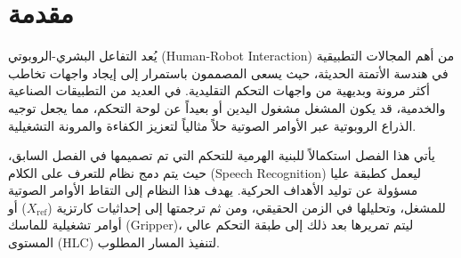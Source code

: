 \section{مقدمة}
يُعد التفاعل البشري-الروبوتي (\textenglish{Human-Robot Interaction}) من أهم المجالات التطبيقية في هندسة الأتمتة الحديثة، حيث يسعى المصممون باستمرار إلى إيجاد واجهات تخاطب أكثر مرونة وبديهية من واجهات التحكم التقليدية. في العديد من التطبيقات الصناعية والخدمية، قد يكون المشغل مشغول اليدين أو بعيداً عن لوحة التحكم، مما يجعل توجيه الذراع الروبوتية عبر الأوامر الصوتية حلاً مثالياً لتعزيز الكفاءة والمرونة التشغيلية.

يأتي هذا الفصل استكمالاً للبنية الهرمية للتحكم التي تم تصميمها في الفصل السابق، حيث يتم دمج نظام للتعرف على الكلام (\textenglish{Speech Recognition}) ليعمل كطبقة عليا مسؤولة عن توليد الأهداف الحركية. يهدف هذا النظام إلى التقاط الأوامر الصوتية للمشغل، وتحليلها في الزمن الحقيقي، ومن ثم ترجمتها إلى إحداثيات كارتزية ($X_{\text{ref}}$) أو أوامر تشغيلية للماسك (\textenglish{Gripper})، ليتم تمريرها بعد ذلك إلى طبقة التحكم عالي المستوى (\textenglish{HLC}) لتنفيذ المسار المطلوب.